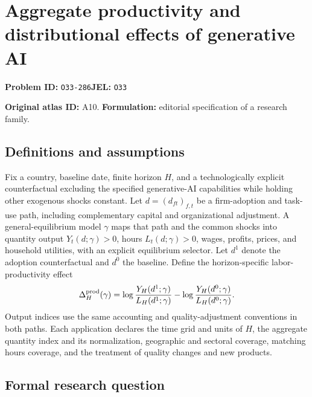 \documentclass[11pt,a4paper]{article}
\begin{document}
\section*{Aggregate productivity and distributional effects of generative AI}
\textbf{Problem ID:} \texttt{O33-286}\quad \textbf{JEL:} \texttt{O33}\par
\label{problem:OP-0020}
\label{atlas:prob:A10}

\noindent\textbf{Original atlas ID:} A10. \textbf{Formulation:} editorial specification of a research family.

\subsection*{Definitions and assumptions}

Fix a country, baseline date, finite horizon $H$, and a technologically explicit counterfactual excluding the specified generative-AI capabilities while holding other exogenous shocks constant. Let $d=(d_{ft})_{f,t}$ be a firm-adoption and task-use path, including complementary capital and organizational adjustment. A general-equilibrium model $\gamma$ maps that path and the common shocks into quantity output $Y_t(d;\gamma)>0$, hours $L_t(d;\gamma)>0$, wages, profits, prices, and household utilities, with an explicit equilibrium selector. Let $d^1$ denote the adoption counterfactual and $d^0$ the baseline. Define the horizon-specific labor-productivity effect
\[
\Delta_H^{\rm prod}(\gamma)=\log\frac{Y_H(d^1;\gamma)}{L_H(d^1;\gamma)}-
 \log\frac{Y_H(d^0;\gamma)}{L_H(d^0;\gamma)}.
\]
Output indices use the same accounting and quality-adjustment conventions in both paths. Each application declares the time grid and units of $H$, the aggregate quantity index and its normalization, geographic and sectoral coverage, matching hours coverage, and the treatment of quality changes and new products.

\subsection*{Formal research question}
\end{document}
